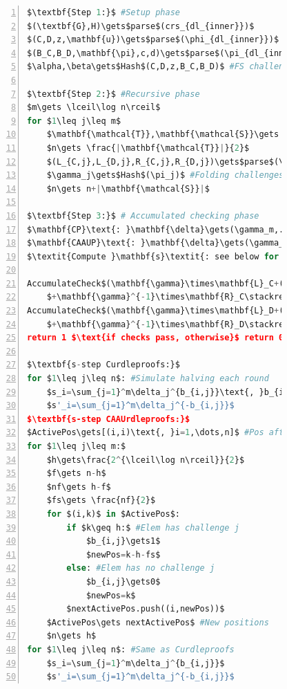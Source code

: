 \begin{figure}[!htb]
        \begin{lstlisting}[language=Python,mathescape=true,label={lst:ipa-verifier-optimized},numbers=left,caption={Optimized verifier computation for CAAU-IPA in CAAUrdleproofs},captionpos=b,frame=single]
$\textbf{Step 1:}$ #Setup phase
$(\textbf{G},H)\gets$parse$(crs_{dl_{inner}})$
$(C,D,z,\mathbf{u})\gets$parse$(\phi_{dl_{inner}})$
$(B_C,B_D,\mathbf{\pi},c,d)\gets$parse$(\pi_{dl_{inner}})$
$\alpha,\beta\gets$Hash$(C,D,z,B_C,B_D)$ #FS challenges

$\textbf{Step 2:}$ #Recursive phase
$m\gets \lceil\log n\rceil$
for $1\leq j\leq m$
    $\mathbf{\mathcal{T}},\mathbf{\mathcal{S}}\gets \textbf{\textit{f(}}n\textbf{\textit{)}}$ #Scheme function
    $n\gets \frac{|\mathbf{\mathcal{T}}|}{2}$
    $(L_{C,j},L_{D,j},R_{C,j},R_{D,j})\gets$parse$(\pi_j)$ #Proof elem
    $\gamma_j\gets$Hash$(\pi_j)$ #Folding challenges
    $n\gets n+|\mathbf{\mathcal{S}}|$

$\textbf{Step 3:}$ # Accumulated checking phase
$\mathbf{CP}\text{: }\mathbf{\delta}\gets(\gamma_m,...,\gamma_1)$ #Construction difference
$\mathbf{CAAUP}\text{: }\mathbf{\delta}\gets(\gamma_1,...,\gamma_m)$
$\textit{Compute }\mathbf{s}\textit{: see below for difference}$

AccumulateCheck$(\mathbf{\gamma}\times\mathbf{L}_C+(B_C+\alpha C+(\alpha^2z)H)$
    $+\mathbf{\gamma}^{-1}\times\mathbf{R}_C\stackrel{?}{=}(c\mathbf{s}\| cd\beta)\times(\mathbf{G}\| H))$
AccumulateCheck$(\mathbf{\gamma}\times\mathbf{L}_D+(B_D+\alpha D)$
    $+\mathbf{\gamma}^{-1}\times\mathbf{R}_D\stackrel{?}{=}d(\mathbf{s'}\circ\mathbf{u})\times\mathbf{G})$
return 1 $\text{if checks pass, otherwise}$ return 0

$\textbf{s-step Curdleproofs:}$
for $1\leq j\leq n$: #Simulate halving each round
    $s_i=\sum_{j=1}^m\delta_j^{b_{i,j}}\text{, }b_{i,j}\in\{0,1\}\text{ s.t. }i=\sum_{j=1}^mb_{i,j}2^j$
    $s'_i=\sum_{j=1}^m\delta_j^{-b_{i,j}}$
$\textbf{s-step CAAUrdleproofs:}$
$ActivePos\gets[(i,i)\text{, }i=1,\dots,n]$ #Pos after round
for $1\leq j\leq m:$
    $h\gets\frac{2^{\lceil\log n\rceil}}{2}$
    $f\gets n-h$
    $nf\gets h-f$
    $fs\gets \frac{nf}{2}$
    for $(i,k)$ in $ActivePos$:
        if $k\geq h:$ #Elem has challenge j
            $b_{i,j}\gets1$
            $newPos=k-h-fs$
        else: #Elem has no challenge j
            $b_{i,j}\gets0$
            $newPos=k$
        $nextActivePos.push((i,newPos))$
    $ActivePos\gets nextActivePos$ #New positions
    $n\gets h$
for $1\leq j\leq n$: #Same as Curdleproofs
    $s_i=\sum_{j=1}^m\delta_j^{b_{i,j}}$
    $s'_i=\sum_{j=1}^m\delta_j^{-b_{i,j}}$
        \end{lstlisting}
    \label{fig:ipa-verifier-optimized}
\end{figure}


